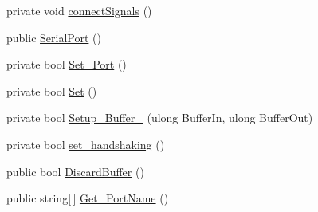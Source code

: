\begin{DoxyCompactItemize}
\item 
private void \hyperlink{namespaceedwinspire_1_1Ports_af8d9afe49636a2f0ba22f1f17bbaba17}{connect\-Signals} ()
\item 
public \hyperlink{namespaceedwinspire_1_1Ports_a293ef58b4105463e6bd4b2d5ad9b3144}{Serial\-Port} ()
\item 
private bool \hyperlink{namespaceedwinspire_1_1Ports_a17877b618445a0e65f46c94bc80bc821}{Set\-\_\-\-Port} ()
\item 
private bool \hyperlink{namespaceedwinspire_1_1Ports_ab4f5440159397421d6f1985dccda8aa7}{Set} ()
\item 
private bool \hyperlink{namespaceedwinspire_1_1Ports_a7a08c939ddf6ae7e1426b3bd061c3f13}{Setup\-\_\-\-Buffer\-\_\-} (ulong Buffer\-In, ulong Buffer\-Out)
\item 
private bool \hyperlink{namespaceedwinspire_1_1Ports_a16c386569d50ef1f47b43bce24c54cde}{set\-\_\-handshaking} ()
\item 
public bool \hyperlink{namespaceedwinspire_1_1Ports_ae3a4888c33e46ef2cb9c21475b39747d}{Discard\-Buffer} ()
\item 
public string\mbox{[}$\,$\mbox{]} \hyperlink{namespaceedwinspire_1_1Ports_ab6cd9fa85820a8013aa6f47c89eb8102}{Get\-\_\-\-Port\-Name} ()
\end{DoxyCompactItemize}
